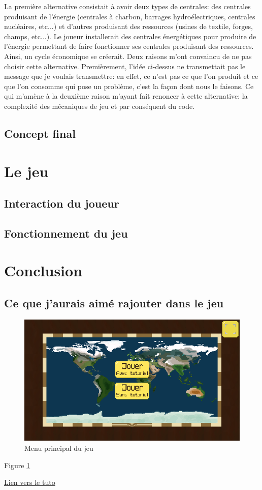 \documentclass{article}
\begin{document}
        
        La première alternative consistait à avoir deux types de centrales: des centrales produisant de l'énergie (centrales à charbon, barrages hydroélectriques, centrales nucléaires, etc...) et d'autres produisant des ressources (usines de textile, forges, champs, etc...). Le joueur installerait des centrales énergétiques pour produire de l'énergie permettant de faire fonctionner ses centrales produisant des ressources. Ainsi, un cycle économique se créerait. 
        Deux raisons m'ont convaincu de ne pas choisir cette alternative. Premièrement, l'idée ci-dessus ne transmettait pas le message que je voulais transmettre: en effet, ce n'est pas ce que l'on produit et ce que l'on consomme qui pose un problème, c'est la façon dont nous le faisons. Ce qui m'amène à la deuxième raison m'ayant fait renoncer à cette alternative: la complexité des mécaniques de jeu et par conséquent du code.
        

        \subsection{Concept final}

        \section{Le jeu}
        \subsection{Interaction du joueur}

        \subsection{Fonctionnement du jeu}
        
        \section{Conclusion}
        \subsection{Ce que j'aurais aimé rajouter dans le jeu}

        \begin{figure}[h]
                \includegraphics[width=\linewidth]{../images/mainMenu}
                \caption{Menu principal du jeu}
                \label{fig:mainMenu}
        \end{figure}

        Figure \ref{fig:mainMenu}

        \href{https://www.latex-tutorial.com/tutorials/pgfplots/}{Lien vers le tuto}
\end{document}
